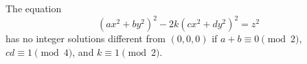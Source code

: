 \begin{proposition}\label{eq:145}
    The equation
\[
    (ax^2+by^2)^2-2k(cx^2+dy^2)^2=z^2
\]
    has no integer solutions different from $(0,0,0)$ if $a+b\equiv0\pmod2$, $cd\equiv1\pmod4$, and $k\equiv1\pmod2$.
\end{proposition}
